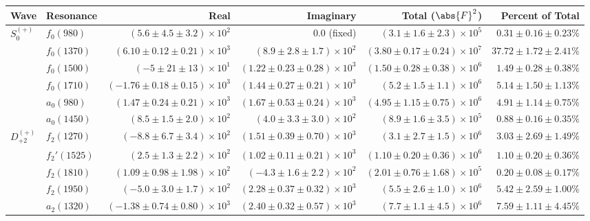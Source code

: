 \begin{table}[ht]
    \begin{center}
        \begin{tabular}{llrrrr}\toprule
        Wave & Resonance & Real & Imaginary & Total ($\abs{F}^2$) & Percent of Total \\\midrule
$S_{0}^{(+)}$ & $f_{0}(980)$ & $(5.6 \pm 4.5 \pm 3.2) \times 10^{2}$ & $0.0$ (fixed) & $(3.1 \pm 1.6 \pm 2.3) \times 10^{5}$ & $0.31 \pm 0.16 \pm 0.23 \%$ \\
 & $f_{0}(1370)$ & $(6.10 \pm 0.12 \pm 0.21) \times 10^{3}$ & $(8.9 \pm 2.8 \pm 1.7) \times 10^{2}$ & $(3.80 \pm 0.17 \pm 0.24) \times 10^{7}$ & $37.72 \pm 1.72 \pm 2.41 \%$ \\
 & $f_{0}(1500)$ & $(-5 \pm 21 \pm 13) \times 10^{1}$ & $(1.22 \pm 0.23 \pm 0.28) \times 10^{3}$ & $(1.50 \pm 0.28 \pm 0.38) \times 10^{6}$ & $1.49 \pm 0.28 \pm 0.38 \%$ \\
 & $f_{0}(1710)$ & $(-1.76 \pm 0.18 \pm 0.15) \times 10^{3}$ & $(1.44 \pm 0.27 \pm 0.21) \times 10^{3}$ & $(5.2 \pm 1.5 \pm 1.1) \times 10^{6}$ & $5.14 \pm 1.50 \pm 1.13 \%$ \\
 & $a_{0}(980)$ & $(1.47 \pm 0.24 \pm 0.21) \times 10^{3}$ & $(1.67 \pm 0.53 \pm 0.24) \times 10^{3}$ & $(4.95 \pm 1.15 \pm 0.75) \times 10^{6}$ & $4.91 \pm 1.14 \pm 0.75 \%$ \\
 & $a_{0}(1450)$ & $(8.5 \pm 1.5 \pm 2.0) \times 10^{2}$ & $(4.0 \pm 3.3 \pm 3.0) \times 10^{2}$ & $(8.9 \pm 1.6 \pm 3.5) \times 10^{5}$ & $0.88 \pm 0.16 \pm 0.35 \%$ \\
$D_{+2}^{(+)}$ & $f_{2}(1270)$ & $(-8.8 \pm 6.7 \pm 3.4) \times 10^{2}$ & $(1.51 \pm 0.39 \pm 0.70) \times 10^{3}$ & $(3.1 \pm 2.7 \pm 1.5) \times 10^{6}$ & $3.03 \pm 2.69 \pm 1.49 \%$ \\
 & $f_{2}'(1525)$ & $(2.5 \pm 1.3 \pm 2.2) \times 10^{2}$ & $(1.02 \pm 0.11 \pm 0.21) \times 10^{3}$ & $(1.10 \pm 0.20 \pm 0.36) \times 10^{6}$ & $1.10 \pm 0.20 \pm 0.36 \%$ \\
 & $f_{2}(1810)$ & $(1.09 \pm 0.98 \pm 1.98) \times 10^{2}$ & $(-4.3 \pm 1.6 \pm 2.2) \times 10^{2}$ & $(2.01 \pm 0.76 \pm 1.68) \times 10^{5}$ & $0.20 \pm 0.08 \pm 0.17 \%$ \\
 & $f_{2}(1950)$ & $(-5.0 \pm 3.0 \pm 1.7) \times 10^{2}$ & $(2.28 \pm 0.37 \pm 0.32) \times 10^{3}$ & $(5.5 \pm 2.6 \pm 1.0) \times 10^{6}$ & $5.42 \pm 2.59 \pm 1.00 \%$ \\
 & $a_{2}(1320)$ & $(-1.38 \pm 0.74 \pm 0.80) \times 10^{3}$ & $(2.40 \pm 0.32 \pm 0.57) \times 10^{3}$ & $(7.7 \pm 1.1 \pm 4.5) \times 10^{6}$ & $7.59 \pm 1.11 \pm 4.45 \%$ \\

\end{tabular}
\end{center}
\end{table}
